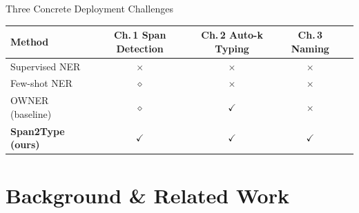 \documentclass[aspectratio=169,10pt]{beamer}
\newcommand{\cmark}{\textcolor{dkgreen}{$\checkmark$}}
\newcommand{\xmark}{\textcolor{dkred}{$\times$}}
\newcommand{\pmark}{\textcolor{gold!80!black}{$\diamond$}}
\begin{document}
\begin{frame}{Three Concrete Deployment Challenges}
  \vspace{0.5em}
  \begin{center}
    \small
    \begin{tabular}{lcccc}
      \toprule
      \textbf{Method} & \textbf{Ch.\,1 Span Detection} & \textbf{Ch.\,2 Auto-k Typing} & \textbf{Ch.\,3 Naming} \\
      \midrule
      Supervised NER   & \xmark & \xmark & \xmark \\
      Few-shot NER     & \pmark & \xmark & \xmark \\
      OWNER (baseline) & \pmark & \cmark & \xmark \\
      \textbf{Span2Type (ours)} & \cmark & \cmark & \cmark \\
      \bottomrule
    \end{tabular}
  \end{center}
\end{frame}

\section{Background \& Related Work}
\end{document}
